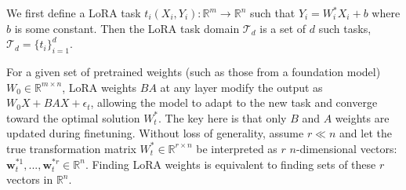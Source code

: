 \begin{definition} 
\label{def:lineartasks}
We first define a LoRA task $t_i (X_i,Y_i): \mathbb{R}^m \rightarrow \mathbb{R}^n$ such that $Y_i = W^*_iX_i + b$ where $b$ is some constant. Then the LoRA task domain $\mathcal{T}_d$ is a set of $d$ such tasks, $\mathcal{T}_d = \{t_i\}^{d}_{i=1}$.
\end{definition}


For a given set of pretrained weights (such as those from a foundation model) $W_0\in\mathbb{R}^{m\times n}$, LoRA weights $BA$ at any layer modify the output as $W_0X + BAX + \epsilon_t$, allowing the model to adapt to the new task and converge toward the optimal solution $W^*_t$. The key here is that only $B$ and $A$ weights are updated during finetuning. 
Without loss of generality, 
assume $r\ll n$ and let the true transformation matrix $W^*_t \in \mathbb{R}^{r \times n}$ be interpreted as $r$ $n$-dimensional vectors: $\mathbf{w}^{*1}_t, ..., \mathbf{w}^{*r}_t \in \mathbb{R}^{n}$. Finding LoRA weights is equivalent to finding sets of these $r$ vectors in $\mathbb{R}^{n}$. 

